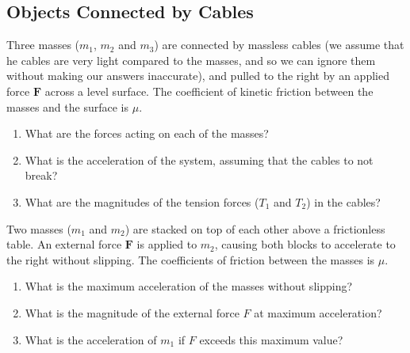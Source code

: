 \subsection{Objects Connected by Cables}
\begin{example}
  Three masses ($m_1$, $m_2$ and $m_3$) are connected by massless cables (we
  assume that he cables are very light compared to the masses, and so we can
  ignore them without making our answers inaccurate), and pulled to the right
  by an applied force $\bm F$ across a level surface. The coefficient of
  kinetic friction between the masses and the surface is $\mu$.
  \begin{center}
  \end{center}
  \begin{enumerate}
  \item What are the forces acting on each of the masses?
  \item What is the acceleration of the system,
    {\color{blue}assuming that the cables to not break?}
  \item What are the magnitudes of the tension forces ($T_1$ and $T_2$) in the
    cables?
  \end{enumerate}
\end{example}



\begin{example}
  Two masses ($m_1$ and $m_2$) are stacked on top of each other above a
  frictionless table. An external force $\bm F$ is applied to $m_2$, causing
  both blocks to accelerate to the right without slipping. The coefficients of
  friction between the masses is $\mu$.
  \begin{center}
  \end{center}
  \begin{enumerate}
  \item What is the maximum acceleration of the masses without slipping?
  \item What is the magnitude of the external force $F$ at maximum
    acceleration?
  \item What is the acceleration of $m_1$ if $F$ exceeds this maximum value?
  \end{enumerate}
\end{example}





